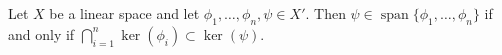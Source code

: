 Let $X$ be a linear space and let $\phi_1, \ldots, \phi_n, \psi \in X'$. Then $\psi \in \operatorname{span}\{\phi_1, \ldots, \phi_n\}$ if and only if $\bigcap_{i=1}^n \ker(\phi_i) \subset \ker(\psi)$.